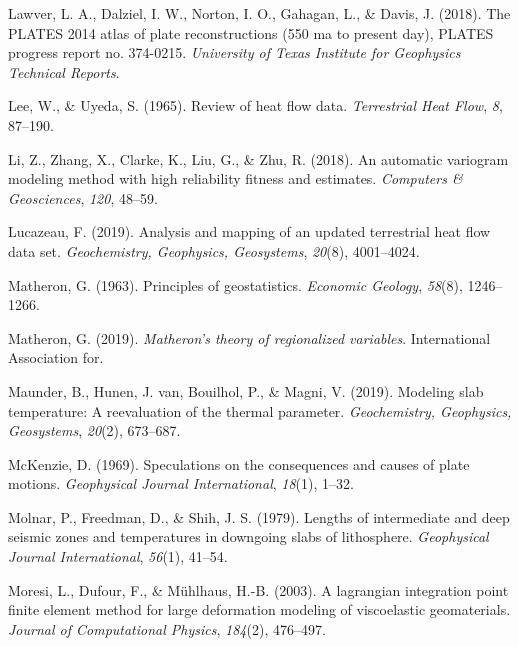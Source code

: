 \begin{CSLReferences}{1}{1}
\leavevmode{}%
Lawver, L. A., Dalziel, I. W., Norton, I. O., Gahagan, L., \& Davis, J. (2018). The PLATES 2014 atlas of plate reconstructions (550 ma to present day), PLATES progress report no. 374-0215. \emph{University of Texas Institute for Geophysics Technical Reports}.

\leavevmode{}%
Lee, W., \& Uyeda, S. (1965). Review of heat flow data. \emph{Terrestrial Heat Flow}, \emph{8}, 87--190.

\leavevmode{}%
Li, Z., Zhang, X., Clarke, K., Liu, G., \& Zhu, R. (2018). An automatic variogram modeling method with high reliability fitness and estimates. \emph{Computers \& Geosciences}, \emph{120}, 48--59.

\leavevmode{}%
Lucazeau, F. (2019). Analysis and mapping of an updated terrestrial heat flow data set. \emph{Geochemistry, Geophysics, Geosystems}, \emph{20}(8), 4001--4024.

\leavevmode{}%
Matheron, G. (1963). Principles of geostatistics. \emph{Economic Geology}, \emph{58}(8), 1246--1266.

\leavevmode{}%
Matheron, G. (2019). \emph{Matheron's theory of regionalized variables}. International Association for.

\leavevmode{}%
Maunder, B., Hunen, J. van, Bouilhol, P., \& Magni, V. (2019). Modeling slab temperature: A reevaluation of the thermal parameter. \emph{Geochemistry, Geophysics, Geosystems}, \emph{20}(2), 673--687.

\leavevmode{}%
McKenzie, D. (1969). Speculations on the consequences and causes of plate motions. \emph{Geophysical Journal International}, \emph{18}(1), 1--32.

\leavevmode{}%
Molnar, P., Freedman, D., \& Shih, J. S. (1979). Lengths of intermediate and deep seismic zones and temperatures in downgoing slabs of lithosphere. \emph{Geophysical Journal International}, \emph{56}(1), 41--54.

\leavevmode{}%
Moresi, L., Dufour, F., \& Mühlhaus, H.-B. (2003). A lagrangian integration point finite element method for large deformation modeling of viscoelastic geomaterials. \emph{Journal of Computational Physics}, \emph{184}(2), 476--497.


\end{CSLReferences}

